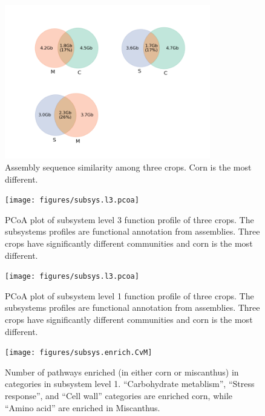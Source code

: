 \documentclass[12pt]{article}
\begin{document}
{    \begin{figure}[tbph!]
    \centering
    \includegraphics[width=0.8\textwidth]{figures/contig.sim.venn}
    \caption[Assembly sequence similarity]{Assembly sequence similarity among three crops. Corn is the most different.}
    \label{fig:contig.sim.venn}
    \end{figure}


    \begin{figure}[tbph!]
    \centering
    \texttt{[image: figures/subsys.l3.pcoa]}
    \caption[PCoA plot based on subsystem profile]{PCoA plot of subsystem level 3 function profile of three crops. The subsystems profiles are functional annotation from assemblies. Three crops have significantly different communities and corn is the most different.}
    \label{fig:subsys.l3.pcoa}
    \end{figure}

    \begin{figure}[tbph!]
    \centering
    \texttt{[image: figures/subsys.l3.pcoa]}
    \caption[PCoA plot based on subsystem profile]{PCoA plot of subsystem level 1 function profile of three crops. The subsystems profiles are functional annotation from assemblies. Three crops have significantly different communities and corn is the most different.}
    \label{fig:subsys.l3.pcoa}
    \end{figure}


    \begin{figure}[tbph!]
    \centering
    \texttt{[image: figures/subsys.enrich.CvM]}
    \caption[Number of pathways enriched in categories in subsystem level 1]{Number of pathways enriched (in either corn or miscanthus) in categories in subsystem level 1. ``Carbohydrate metablism'', ``Stress response'', and ``Cell wall'' categories are enriched corn, while ``Amino acid'' are enriched in Miscanthus.}
    \label{fig:subsys.enrich.CvM}
    \end{figure}


}
\end{document}
